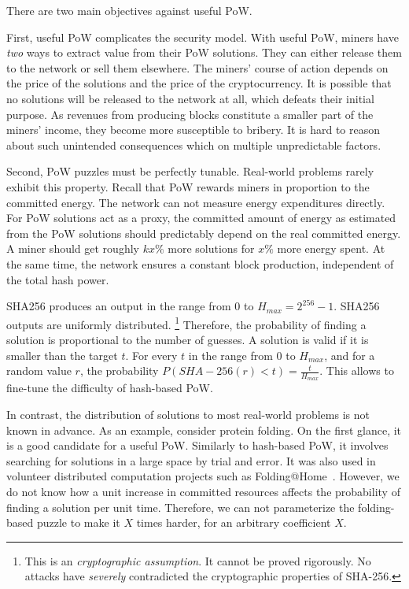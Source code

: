 There are two main objectives against useful PoW.

First, useful PoW complicates the security model.
With useful PoW, miners have \textit{two} ways to extract value from their PoW solutions.
They can either release them to the network or sell them elsewhere.
The miners' course of action depends on the price of the solutions and the price of the cryptocurrency.
It is possible that no solutions will be released to the network at all, which defeats their initial purpose.
As revenues from producing blocks constitute a smaller part of the miners' income, they become more susceptible to bribery.
It is hard to reason about such unintended consequences which on multiple unpredictable factors.

Second, PoW puzzles must be perfectly tunable.
Real-world problems rarely exhibit this property.
Recall that PoW rewards miners in proportion to the committed energy.
The network can not measure energy expenditures directly.
For PoW solutions act as a proxy, the committed amount of energy as estimated from the PoW solutions should predictably depend on the real committed energy.
A miner should get roughly $kx\%$ more solutions for $x\%$ more energy spent.
At the same time, the network ensures a constant block production, independent of the total hash power.

SHA256 produces an output in the range from $0$ to $H_{max} = 2^{256}-1$.
SHA256 outputs are uniformly distributed.
\footnote{This is an \textit{cryptographic assumption}. It cannot be proved rigorously. No attacks have \textit{severely} contradicted the cryptographic properties of SHA-256.}
Therefore, the probability of finding a solution is proportional to the number of guesses.
A solution is valid if it is smaller than the target $t$.
For every $t$ in the range from $0$ to $H_{max}$, and for a random value $r$, the probability $P(SHA-256(r) < t) = \frac{t}{H_{max}}$.
This allows to fine-tune the difficulty of hash-based PoW.

In contrast, the distribution of solutions to most real-world problems is not known in advance.
As an example, consider protein folding.
On the first glance, it is a good candidate for a useful PoW.
Similarly to hash-based PoW, it involves searching for solutions in a large space by trial and error.
It was also used in volunteer distributed computation projects such as Folding@Home~\cite{Beberg2009}.
However, we do not know how a unit increase in committed resources affects the probability of finding a solution per unit time.
Therefore, we can not parameterize the folding-based puzzle to make it $X$ times harder, for an arbitrary coefficient $X$.



